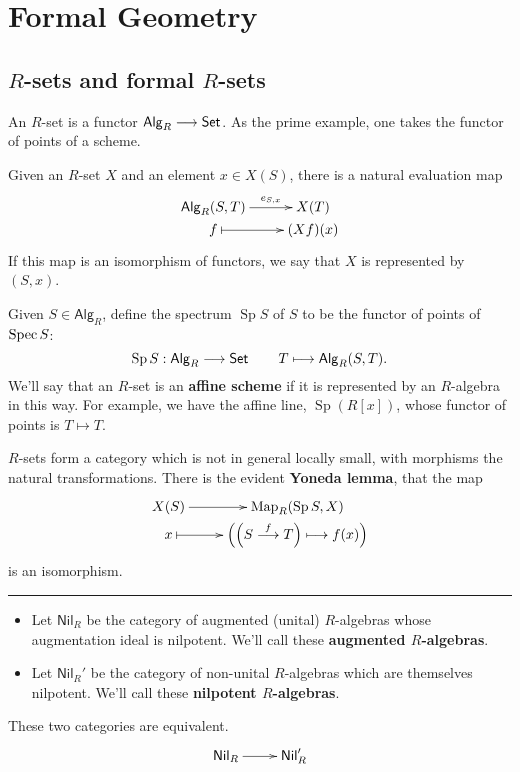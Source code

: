 \documentclass[11pt]{article}
\newcommand{\RAlg}{\mathsf{Alg}_R}
\newcommand{\RNil}{\mathsf{Nil}_R}
\DeclareMathOperator{\SPec}{Sp}
\begin{document}
\section{Formal Geometry}
\subsection{$R$-sets and formal $R$-sets}
\begin{itemise}
\setlength{\parindent}{.25in}
\item An $R$-set is a functor $\RAlg\to\Set$. As the prime example, one takes the functor of points of a scheme.
\item Given an $R$-set $X$ and an element $x\in X(S)$, there is a natural evaluation map
\[\xymatrix@R=0mm{
\ar[r]^-{e_{S,x}}%
\RAlg(S,T)&%
X(T)\\%
f%
\ar@{|->}[r]&
(Xf)(x)%
}\]
If this map is an isomorphism of functors, we say that $X$ is represented by $(S,x)$.
\item Given $S\in\RAlg$, define the spectrum $\SPec S$ of $S$ to be the functor of points of $\operatorname{Spec} S$:
\[\SPec S:\RAlg\to\Set\qquad T\mapsto \RAlg(S,T).\]
We'll say that an $R$-set is an \textbf{affine scheme} if it is represented by an $R$-algebra in this way. For example, we have the affine line, $\SPec(R[x])$, whose functor of points is $T\mapsto T$.
\item $R$-sets form a category which is not in general locally small, with morphisms the natural transformations. There is the evident \textbf{Yoneda lemma}, that the map
\[\xymatrix@R=0mm{
\ar[r]^-{}%
X(S)&%
\Map_R(\SPec S,X)\\%
x%
\ar@{|->}[r]&
\left(\left(S\overset{f}{\to}T\right)\mapsto f(x)\right)%
}\]
is an isomorphism.
\hrule
\item
\begin{itemize}\squishlist
\item Let $\RNil$ be the category of augmented (unital) $R$-algebras whose augmentation ideal is nilpotent. We'll call these \textbf{augmented $R$-algebras}.
\item Let $\RNil'$ be the category of non-unital $R$-algebras which are themselves nilpotent. We'll call these \textbf{nilpotent $R$-algebras}.
\end{itemize}
\noindent These two categories are equivalent.
\[\xymatrix@R=0mm{
\ar[r]^-{}%
\RNil&%
\RNil'\\%
}\]
\end{itemise}
\end{document}
